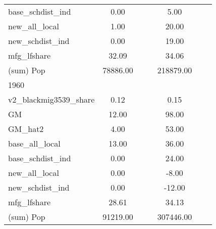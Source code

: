 \begin{table}[htbp]
\begin{tabular}{l*{2}{ccc}}
base\_schdist\_ind    &        0.00&            &            &        5.00&            &            \\
new\_all\_local       &        1.00&            &            &       20.00&            &            \\
new\_schdist\_ind     &        0.00&            &            &       19.00&            &            \\
mfg\_lfshare         &       32.09&            &            &       34.06&            &            \\
(sum) Pop           &    78886.00&            &            &   218879.00&            &            \\
\midrule
1960                &            &            &            &            &            &            \\
v2\_blackmig3539\_share&        0.12&            &            &        0.15&            &            \\
GM                  &       12.00&            &            &       98.00&            &            \\
GM\_hat2             &        4.00&            &            &       53.00&            &            \\
base\_all\_local      &       13.00&            &            &       36.00&            &            \\
base\_schdist\_ind    &        0.00&            &            &       24.00&            &            \\
new\_all\_local       &        0.00&            &            &       -8.00&            &            \\
new\_schdist\_ind     &        0.00&            &            &      -12.00&            &            \\
mfg\_lfshare         &       28.61&            &            &       34.13&            &            \\
(sum) Pop           &    91219.00&            &            &   307446.00&            &            \\
\bottomrule
\end{tabular}
\end{table}
